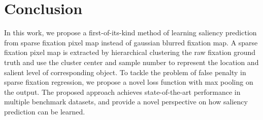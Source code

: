 \documentclass[letterpaper, 10 pt, conference]{ieeeconf}  %
\begin{document}
\section{Conclusion}

\par In this work, we propose a first-of-its-kind method of learning saliency prediction from sparse fixation pixel map instead of gaussian blurred fixation map. A sparse fixation pixel map is extracted by hierarchical clustering the raw fixation ground truth and use the cluster center and sample number to represent the location and salient level of corresponding object. To tackle the problem of false penalty in sparse fixation regression, we propose a novel loss function with max pooling on the output. The proposed approach achieves state-of-the-art performance in multiple benchmark datasets, and provide a novel perspective on how saliency prediction can be learned.
\end{document}
